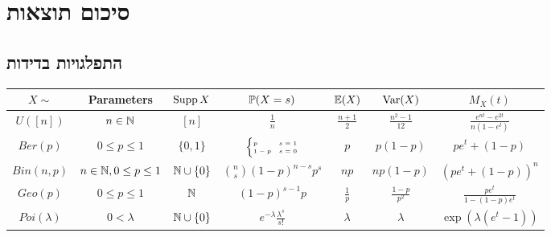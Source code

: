 \section{סיכום תוצאות}

\subsection{התפלגויות בדידות}
\begin{otherlanguage}{english}
	\begin{center}
		\begin{tabular}{c | c c c c c c} %
			$X \sim$ & Parameters & $\operatorname{Supp} X$ & $\mathbb{P}(X = s)$ & $\mathbb{E}(X)$ & $\operatorname{Var}(X)$ & $M_X(t)$ \\
			\hline %
			$U([n])$ & $n \in \mathbb{N}$ & $[n]$ & $\frac{1}{n}$ & $\frac{n + 1}{2}$ & $\frac{n^2 - 1}{12}$ & $\frac{e^{nt} - e^{2t}}{n(1 - e^t)}$ \\
			\hline %
			$Ber(p)$ & $0 \le p \le 1$ & $\{0, 1\}$ & $\tiny\begin{cases} p & s = 1 \\ 1 - p & s = 0 \end{cases}$ & $p$ & $p(1 - p)$ & $p e^t + (1 - p)$ \\
			\hline %
			$Bin(n, p)$  & $n \in \mathbb{N}, 0 \le p \le 1$ & $\mathbb{N} \cup \{0\}$ & $\binom{n}{s} {(1 - p)}^{n - s} p^s$ & $np$ & $np(1 - p)$ & ${(pe^t + (1 - p))}^n$ \\
			\hline %
			$Geo(p)$ & $0 \le p \le 1$ & $\mathbb{N}$ & ${(1 - p)}^{s - 1} p$ & $\frac{1}{p}$ & $\frac{1 - p}{p^2}$ & $\frac{p e^t}{1 - (1 - p) e^t}$ \\
			\hline %
			$Poi(\lambda)$ & $0 < \lambda$ & $\mathbb{N} \cup \{0\}$ & $e^{-\lambda} \frac{\lambda^s}{s!}$ & $\lambda$ & $\lambda$ & $\exp(\lambda(e^t - 1))$ \\
		\end{tabular}
	\end{center}
\end{otherlanguage}

